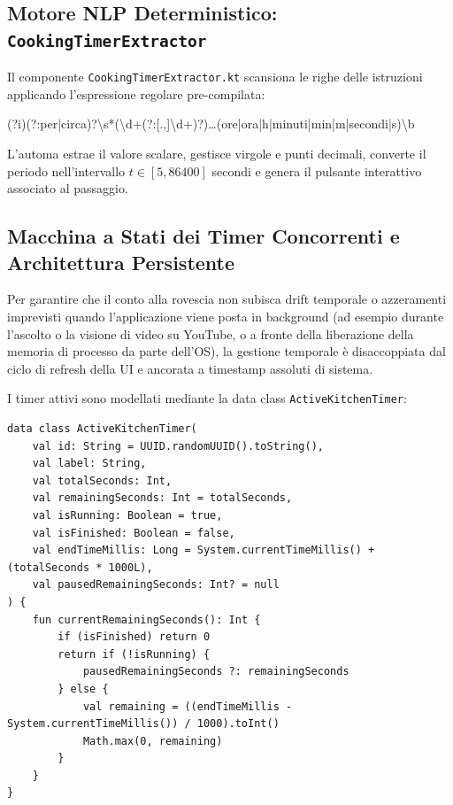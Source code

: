 \documentclass[11pt,a4paper,titlepage]{article}
\begin{document}
\subsection{Motore NLP Deterministico: \texttt{CookingTimerExtractor}}
Il componente \texttt{CookingTimerExtractor.kt} scansiona le righe delle istruzioni applicando l'espressione regolare pre-compilata:
\begin{center}
\small\ttfamily
(?i)(?:per|circa)?\textbackslash s*(\textbackslash d+(?:[.,]\textbackslash d+)?)\dots(ore|ora|h|minuti|min|m|secondi|s)\textbackslash b
\end{center}
L'automa estrae il valore scalare, gestisce virgole e punti decimali, converte il periodo nell'intervallo $t \in [5, 86400]$ secondi e genera il pulsante interattivo associato al passaggio.

\subsection{Macchina a Stati dei Timer Concorrenti e Architettura Persistente}
Per garantire che il conto alla rovescia non subisca drift temporale o azzeramenti imprevisti quando l'applicazione viene posta in background (ad esempio durante l'ascolto o la visione di video su YouTube, o a fronte della liberazione della memoria di processo da parte dell'OS), la gestione temporale \`e disaccoppiata dal ciclo di refresh della UI e ancorata a timestamp assoluti di sistema.

I timer attivi sono modellati mediante la data class \texttt{ActiveKitchenTimer}:
\begin{lstlisting}[caption={Modello dati immutabile del timer con epoch timestamp assoluto}]
data class ActiveKitchenTimer(
    val id: String = UUID.randomUUID().toString(),
    val label: String,
    val totalSeconds: Int,
    val remainingSeconds: Int = totalSeconds,
    val isRunning: Boolean = true,
    val isFinished: Boolean = false,
    val endTimeMillis: Long = System.currentTimeMillis() + (totalSeconds * 1000L),
    val pausedRemainingSeconds: Int? = null
) {
    fun currentRemainingSeconds(): Int {
        if (isFinished) return 0
        return if (!isRunning) {
            pausedRemainingSeconds ?: remainingSeconds
        } else {
            val remaining = ((endTimeMillis - System.currentTimeMillis()) / 1000).toInt()
            Math.max(0, remaining)
        }
    }
}
\end{lstlisting}
\end{document}
